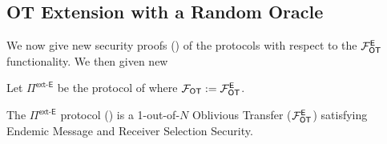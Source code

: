 \subsection{OT Extension with a Random Oracle}\label{sec:extSec}

We now give new security proofs () of the \cite{C:KelOrsSch15,RSA:OrrOrsSch17} protocols with respect to the $\mathcal{F}_{\mathsf{OT}}^\mathsf{E}$ functionality. We then given new 


\begin{definition}\label{def:ext_E_E}
	Let $\Pi^{\textsf{ext-E}}$ be the protocol of  where $\mathcal{F}_{\mathsf{OT}}:=\mathcal{F}_{\mathsf{OT}}^\mathsf{E}$.
\end{definition}



\begin{lemma}\label{lem:ext-E}
	The $\Pi^{\textsf{ext-E}}$ protocol () is a 1-out-of-$N$ Oblivious Transfer ($\mathcal{F}_{\mathsf{OT}}^\mathsf{E}$) satisfying Endemic Message and Receiver Selection Security.
\end{lemma}
